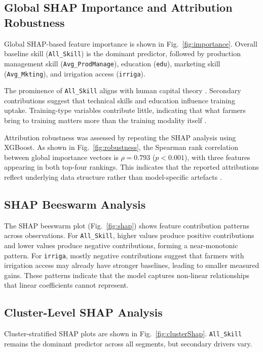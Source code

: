 \documentclass[3p,twocolumn,authoryear]{elsarticle}
\begin{document}
\subsection{Global SHAP Importance and Attribution Robustness}

Global SHAP-based feature importance is shown in Fig.~\ref{fig:importance}.
Overall baseline skill (\texttt{All\_Skill}) is the dominant predictor, followed
by production management skill (\texttt{Avg\_ProdManage}), education
(\texttt{edu}), marketing skill (\texttt{Avg\_Mkting}), and irrigation access
(\texttt{irriga}).

The prominence of \texttt{All\_Skill} aligns with human capital theory
\citep{feder1985}. Secondary contributions suggest that technical skills and
education influence training uptake. Training-type variables contribute little,
indicating that what farmers bring to training matters more than the training
modality itself \citep{ryo2022}.

Attribution robustness was assessed by repeating the SHAP analysis using
XGBoost. As shown in Fig.~\ref{fig:robustness}, the Spearman rank correlation
between global importance vectors is $\rho = 0.793$ ($p < 0.001$), with three
features appearing in both top-four rankings. This indicates that the reported
attributions reflect underlying data structure rather than model-specific
artefacts \citep{lundberg2020}.

\subsection{SHAP Beeswarm Analysis}

The SHAP beeswarm plot (Fig.~\ref{fig:shap}) shows feature contribution
patterns across observations. For \texttt{All\_Skill}, higher values produce
positive contributions and lower values produce negative contributions, forming
a near-monotonic pattern. For \texttt{irriga}, mostly negative contributions
suggest that farmers with irrigation access may already have stronger baselines,
leading to smaller measured gains. These patterns indicate that the model
captures non-linear relationships that linear coefficients cannot represent.

\subsection{Cluster-Level SHAP Analysis}

Cluster-stratified SHAP plots are shown in Fig.~\ref{fig:clusterShap}.
\texttt{All\_Skill} remains the dominant predictor across all segments, but
secondary drivers vary.
\end{document}
